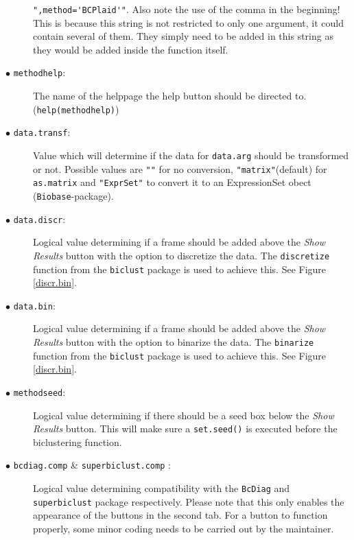 \documentclass[a4paper]{article}\usepackage[]{graphicx}\usepackage[]{color}
\begin{document}
\begin{description}
  \verb|",method='BCPlaid'"|. Also note the use of the comma in the beginning!
  This is because this string is not restricted to only one argument, it could
  contain several of them. They simply need to be added in this string as they
  would be added inside the function itself.
  \item[$\bullet$ \texttt{methodhelp}:] The name of the helppage the help button
  should be directed to. (\verb|help(methodhelp)|)
  \item[$\bullet$ \texttt{data.transf}:] Value which will determine if the data
  for \verb|data.arg| should be transformed or not. Possible values are
  \verb|""| for no conversion, \verb|"matrix"|(default) for \verb|as.matrix| and
  \verb|"ExprSet"| to convert it to an ExpressionSet obect
  (\texttt{Biobase}-package).
    \item[$\bullet$ \texttt{data.discr}:] Logical value determining if a frame
  should be added above the {\it Show Results} button with the option to
  discretize the data. The \verb|discretize| function from the \verb|biclust|
  package is used to achieve this. See Figure \ref{discr.bin}.
  
  \item[$\bullet$ \texttt{data.bin}:] Logical value determining if a frame
  should be added above the {\it Show Results} button with the option to
  binarize the data. The \verb|binarize| function from the \verb|biclust|
  package is used to achieve this. See Figure \ref{discr.bin}.
  
  \item[$\bullet$ \texttt{methodseed}:] Logical value determining if there
  should be a seed box below the {\it Show Results} button. This will make sure
  a \verb|set.seed()| is executed before the biclustering function.
  
  \item[$\bullet$ \texttt{bcdiag.comp} \& \texttt{superbiclust.comp} :] Logical
  value determining compatibility with the \verb|BcDiag| and \verb|superbiclust|
  package respectively. Please note that this only enables the appearance of the
  buttons in the second tab. For a button to function properly, some minor
  coding needs to be carried out by the maintainer.
  
\end{description}
\end{document}
